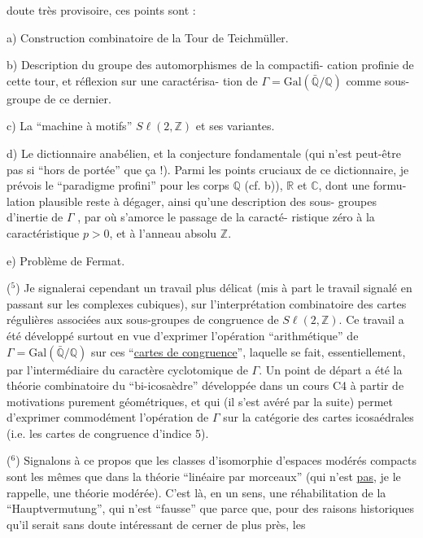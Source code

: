 
doute très provisoire, ces points sont :

a) Construction combinatoire de la Tour de Teichmüller.

b) Description du groupe des automorphismes de la compactifi-%
cation profinie de cette tour, et réflexion sur une caractérisa-%
tion de $\Gamma = \mathrm{Gal}(\bar{\mathbb{Q}}/\mathbb{Q})$ comme sous-groupe de ce dernier.

c) La ``machine à motifs'' $S\ell(2,\mathbb{Z})$ et ses variantes.

d) Le dictionnaire anabélien, et la conjecture fondamentale
(qui n'est peut-être pas si ``hors de portée'' que ça !). Parmi
les points cruciaux de ce dictionnaire, je prévois le ``paradigme
profini'' pour les corps $\mathbb{Q}$ (cf. b)), $\mathbb{R}$ et $\mathbb{C}$, dont une formu-%
lation plausible reste à dégager, ainsi qu'une description des sous-%
groupes d'inertie de $\Gamma$ , par où s'amorce le passage de la caracté-%
ristique zéro à la caractéristique $p > 0$, et à l'anneau absolu $\mathbb{Z}$.

e) Problème de Fermat.

($^5$) Je signalerai cependant un travail plus délicat (mis à part
le travail signalé en passant sur les complexes cubiques), sur
l'interprétation combinatoire des cartes régulières associées aux
sous-groupes de congruence de $S\ell(2,\mathbb{Z})$. Ce travail a été développé
surtout en vue d'exprimer l'opération ``arithmétique'' de $\Gamma = \mathrm{Gal}(\bar{\mathbb{Q}}/\mathbb{Q})$
sur ces ``\uline{cartes de congruence}'', laquelle se fait, essentiellement,
par l'intermédiaire du caractère cyclotomique de $\Gamma$. Un point de
départ a été la théorie combinatoire du ``bi-icosaèdre'' développée
dans un cours C4 à partir de motivations purement géométriques,
et qui (il s'est avéré par la suite) permet d'exprimer commodément
l'opération de $\Gamma$ sur la catégorie des cartes icosaédrales (i.e.
les cartes de congruence d'indice 5).

($^6$) Signalons à ce propos que les classes d'isomorphie d'espaces
modérés compacts sont les mêmes que dans la théorie ``linéaire par
morceaux'' (qui n'est \uline{pas}, je le rappelle, une théorie modérée).
C'est là, en un sens, une réhabilitation de la ``Hauptvermutung'',
qui n'est ``fausse'' que parce que, pour des raisons historiques
qu'il serait sans doute intéressant de cerner de plus près, les


